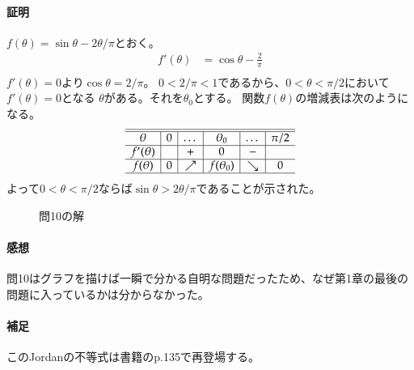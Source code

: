 \paragraph{証明}
$f(\theta)=\sin\theta-2\theta/\pi$とおく。
\begin{align*}
    f'(\theta)&=\cos\theta-\frac{2}{\pi}\\
\end{align*}
$f'(\theta)=0$より$\cos\theta=2/\pi$。
$0<2/\pi<1$であるから、$0<\theta<\pi/2$において$f'(\theta)=0$となる
$\theta$がある。それを$\theta_0$とする。
関数$f(\theta)$の増減表は次のようになる。
\begin{align*}
    \begin{array}{c|c|c|c|c|c}\hline\hline
        \theta     & 0 & \dots    & \theta_0 & \dots & \pi/2 \\ \hline
        f'(\theta) &   & +        & 0        & -        & \\ \hline
        f(\theta)  & 0 & \nearrow & f(\theta_0)        & \searrow & 0 \\ \hline
    \end{array}
\end{align*}
よって$0<\theta<\pi/2$ならば$\sin\theta>2\theta/\pi$であることが示された。
\begin{figure}[t]
    \centering
    \scalebox{0.6}{}
    \caption{問10の解}
\end{figure}
\paragraph{感想}
問10はグラフを描けば一瞬で分かる自明な問題だったため、なぜ第1章の最後の問題に入っているかは分からなかった。

\paragraph{補足}
このJordanの不等式は書籍のp.135で再登場する。